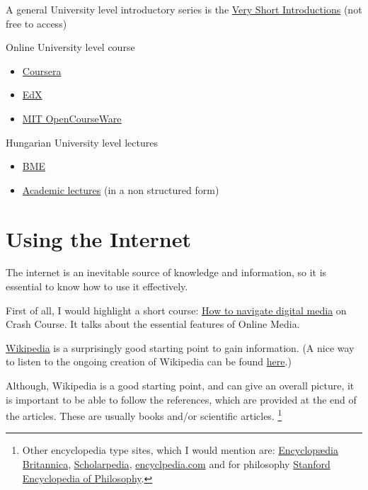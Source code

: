 \documentclass{article}
\begin{document}
A general University level introductory series is the \href{https://www.veryshortintroductions.com/browse}{Very Short Introductions} (not free to access)

Online University level course
\begin{itemize}
    \item \href{https://www.coursera.org/}{Coursera}
    \item \href{https://www.edx.org/}{EdX}
    \item \href{https://ocw.mit.edu/index.htm}{MIT OpenCourseWare}
\end{itemize}

Hungarian University level lectures
\begin{itemize}
    \item \href{https://bme.videotorium.hu/}{BME}
    \item \href{http://videotorium.hu/}{Academic lectures} (in a non structured form)
\end{itemize}


\section{Using the Internet}

The internet is an inevitable source of knowledge and information, so it is essential to know how to use it effectively.

First of all, I would highlight a short course: \href{https://www.youtube.com/playlist?list=PL8dPuuaLjXtN07XYqqWSKpPrtNDiCHTzU}{How to navigate digital media} on Crash Course. It talks about the essential features of Online Media.


\href{https://www.wikipedia.org/}{Wikipedia} is a surprisingly good starting point to gain information. (A nice way to listen to the ongoing creation of Wikipedia can be found \href{http://listen.hatnote.com/#nowelcomes,en}{here}.)

Although, Wikipedia is a good starting point, and can give an overall picture, it is important to be able to follow the references, which are provided at the end of the articles.
These are usually books and/or scientific articles. \footnote{Other encyclopedia type sites, which I would mention are: \href{https://www.britannica.com/}{Encyclopædia Britannica}, \href{http://www.scholarpedia.org/article/Main_Page}{Scholarpedia}, \href{https://www.encyclopedia.com/}{encyclpedia.com} and for philosophy \href{https://plato.stanford.edu/index.html}{Stanford Encyclopedia of Philosophy}.}
\end{document}
